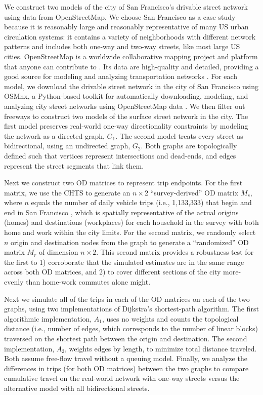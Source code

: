 \documentclass{article}
\begin{document}
We construct two models of the city of San Francisco's drivable street network using data from OpenStreetMap. We choose San Francisco as a case study because it is reasonably large and reasonably representative of many US urban circulation systems: it contains a variety of neighborhoods with different network patterns and includes both one-way and two-way streets, like most large US cities. OpenStreetMap is a worldwide collaborative mapping project and platform that anyone can contribute to \citep{jokar_arsanjani_openstreetmap_2015}. Its data are high-quality and detailed, providing a good source for modeling and analyzing transportation networks \citep{barron_comprehensive_2014,zielstra_assessing_2013,barrington-leigh_worlds_2017,zhao_agent-based_2019}. For each model, we download the drivable street network in the city of San Francisco using OSMnx, a Python-based toolkit for automatically downloading, modeling, and analyzing city street networks using OpenStreetMap data \citep{boeing_osmnx:_2017,boeing_multi-scale_2018,boeing_street_2019}. We then filter out freeways to construct two models of the surface street network in the city. The first model preserves real-world one-way directionality constraints by modeling the network as a directed graph, $G_1$. The second model treats every street as bidirectional, using an undirected graph, $G_2$. Both graphs are topologically defined such that vertices represent intersections and dead-ends, and edges represent the street segments that link them.

Next we construct two OD matrices to represent trip endpoints. For the first matrix, we use the CHTS to generate an $n \times 2$ \enquote{survey-derived} OD matrix $M_s$, where $n$ equals the number of daily vehicle trips (i.e., 1,133,333) that begin and end in San Francisco \citep{san_francisco_county_transportation_authority_tncs_2017}, which is spatially representative of the actual origins (homes) and destinations (workplaces) for each household in the survey with both home and work within the city limits. For the second matrix, we randomly select $n$ origin and destination nodes from the graph to generate a \enquote{randomized} OD matrix $M_r$ of dimension $n \times 2$. This second matrix provides a robustness test for the first to 1) corroborate that the simulated estimates are in the same range across both OD matrices, and 2) to cover different sections of the city more-evenly than home-work commutes alone might.

Next we simulate all of the trips in each of the OD matrices on each of the two graphs, using two implementations of Dijkstra's shortest-path algorithm. The first algorithmic implementation, $A_1$, uses no weights and counts the topological distance (i.e., number of edges, which corresponds to the number of linear blocks) traversed on the shortest path between the origin and destination. The second implementation, $A_2$, weights edges by length, to minimize total distance traveled. Both assume free-flow travel without a queuing model. Finally, we analyze the differences in trips (for both OD matrices) between the two graphs to compare cumulative travel on the real-world network with one-way streets versus the alternative model with all bidirectional streets.
\end{document}
